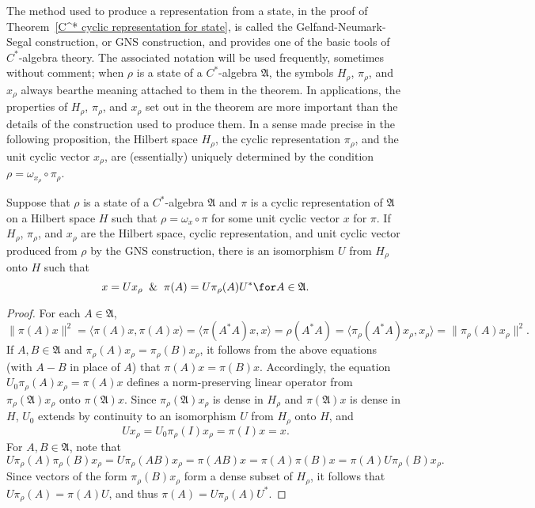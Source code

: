 The method used to produce a representation from a state, in the proof of Theorem~\ref{C^* cyclic representation for state}, is called the Gelfand-Neumark-Segal construction, or GNS construction, and provides one of the basic tools of $C^*$-algebra theory. The associated notation will be used frequently, sometimes without comment; when $\rho$ is a state of a $C^*$-algebra $\mathfrak{A}$, the symbols $H_\rho$, $\pi_\rho$, and $x_\rho$ always bearthe meaning attached to them in the theorem. In applications, the properties of $H_\rho$, $\pi_\rho$, and $x_\rho$ set out in the theorem are more important than the details of the construction used to produce them. In a sense made precise in the following proposition, the Hilbert space $H_\rho$, the cyclic representation $\pi_\rho$, and the unit cyclic vector $x_\rho$, are (essentially) uniquely determined by the condition $\rho=\omega_{x_\rho}\circ\pi_\rho$.
\begin{proposition}\label{C^* algebra GNS construction unique}
Suppose that $\rho$ is a state of a $C^*$-algebra $\mathfrak{A}$ and $\pi$ is a cyclic representation of $\mathfrak{A}$ on a Hilbert space $H$ such that $\rho=\omega_x\circ\pi$ for some unit cyclic vector $x$ for $\pi$. If $H_\rho$, $\pi_\rho$, and $x_\rho$ are the Hilbert space, cyclic representation, and unit cyclic vector produced from $\rho$ by the GNS construction, there is an isomorphism $U$ from $H_\rho$ onto $H$ such that
\[x=Ux_\rho\And \pi(A)=U\pi_\rho(A)U^*\for A\in\mathfrak{A}.\]
\end{proposition}
\begin{proof}
For each $A\in\mathfrak{A}$,
\[\|\pi(A)x\|^2=\langle\pi(A)x,\pi(A)x\rangle=\langle \pi(A^*A)x,x\rangle=\rho(A^*A)=\langle\pi_\rho(A^*A)x_\rho,x_\rho\rangle=\|\pi_\rho(A)x_\rho\|^2.\]
If $A,B\in\mathfrak{A}$ and $\pi_\rho(A)x_\rho=\pi_\rho(B)x_\rho$, it follows from the above equations (with $A-B$ in place of $A$) that $\pi(A)x=\pi(B)x$. Accordingly, the equation $U_0\pi_\rho(A)x_\rho=\pi(A)x$ defines a norm-preserving linear operator from $\pi_\rho(\mathfrak{A})x_\rho$ onto $\pi(\mathfrak{A})x$. Since $\pi_\rho(\mathfrak{A})x_\rho$ is dense in $H_\rho$ and $\pi(\mathfrak{A})x$ is dense in $H$, $U_0$ extends by continuity to an isomorphism $U$ from $H_\rho$ onto $H$, and
\[Ux_\rho=U_0\pi_\rho(I)x_\rho=\pi(I)x=x.\]
For $A,B\in\mathfrak{A}$, note that
\[U\pi_\rho(A)\pi_\rho(B)x_\rho=U\pi_\rho(AB)x_\rho=\pi(AB)x=\pi(A)\pi(B)x=\pi(A)U\pi_\rho(B)x_\rho.\]
Since vectors of the form $\pi_\rho(B)x_\rho$ form a dense subset of $H_\rho$, it follows that $U\pi_\rho(A)=\pi(A)U$, and thus $\pi(A)=U\pi_\rho(A)U^*$.
\end{proof}
